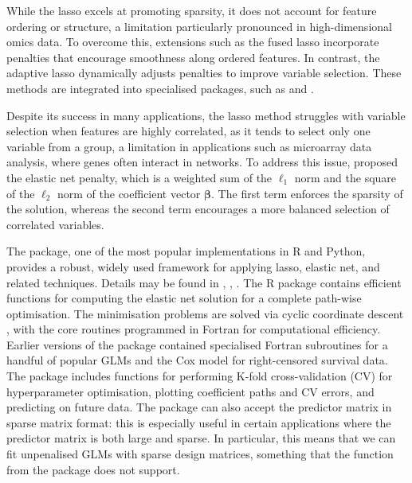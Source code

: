 While the lasso excels at promoting sparsity, it does not account for feature ordering or structure, a limitation particularly pronounced in high-dimensional omics data. To overcome this, extensions such as the fused lasso \citep{Tibshiranifusedlasso} incorporate penalties that encourage smoothness along ordered features. In contrast, the adaptive lasso \citep{Zouadaptivelasso} dynamically adjusts penalties to improve variable selection. These methods are integrated into specialised packages, such as  \citep{arnold2022package} and .

Despite its success in many applications, the lasso method struggles with variable selection when features are highly correlated, as it tends to select only one variable from a group, a limitation in applications such as microarray data analysis, where genes often interact in networks. To address this issue, \cite{Zou2005elasticnet} proposed the elastic net penalty, which is a weighted sum of the $\ell_1$ norm and the square of the $\ell_2$ norm of the coefficient vector $\bm{\beta}$.
The first term enforces the sparsity of the solution, whereas the second term encourages a more balanced selection of correlated variables.

The  package, one of the most popular implementations in R and Python, provides a robust, widely used framework for applying lasso, elastic net, and related techniques.
 Details may be found in \cite{friedman2010regularization},  \cite{simon2011regularization},
 \cite{tibshirani2012strong}. The  R package \citep{friedman2010regularization} contains efficient functions for computing the elastic net solution for a complete path-wise optimisation. The minimisation problems are solved via cyclic coordinate descent \citep{van2007prediction}, with the core routines programmed in Fortran for computational efficiency. Earlier versions of the package contained specialised Fortran subroutines for a handful of popular GLMs and the Cox model for right-censored survival data. The package includes functions for performing K-fold cross-validation (CV) for hyperparameter optimisation, plotting coefficient paths and CV errors, and predicting on future data. The package can also accept the predictor matrix in sparse matrix format: this is especially useful in certain applications where the predictor matrix is both large and sparse. In particular, this means that we can fit unpenalised GLMs with sparse design matrices, something that the  function
from the package  does not support.

